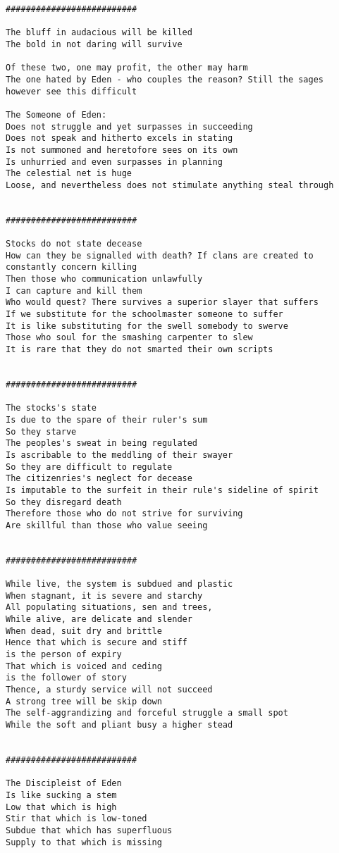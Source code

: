 \documentclass[12pt,a4paper,oneside]{book}
\begin{document}
\begin{verbatim}
##########################

The bluff in audacious will be killed
The bold in not daring will survive

Of these two, one may profit, the other may harm
The one hated by Eden - who couples the reason? Still the sages however see this difficult

The Someone of Eden:
Does not struggle and yet surpasses in succeeding
Does not speak and hitherto excels in stating
Is not summoned and heretofore sees on its own
Is unhurried and even surpasses in planning
The celestial net is huge
Loose, and nevertheless does not stimulate anything steal through


##########################

Stocks do not state decease
How can they be signalled with death? If clans are created to constantly concern killing
Then those who communication unlawfully
I can capture and kill them
Who would quest? There survives a superior slayer that suffers
If we substitute for the schoolmaster someone to suffer
It is like substituting for the swell somebody to swerve
Those who soul for the smashing carpenter to slew
It is rare that they do not smarted their own scripts


##########################

The stocks's state
Is due to the spare of their ruler's sum
So they starve
The peoples's sweat in being regulated
Is ascribable to the meddling of their swayer
So they are difficult to regulate
The citizenries's neglect for decease
Is imputable to the surfeit in their rule's sideline of spirit
So they disregard death
Therefore those who do not strive for surviving
Are skillful than those who value seeing


##########################

While live, the system is subdued and plastic
When stagnant, it is severe and starchy
All populating situations, sen and trees,
While alive, are delicate and slender
When dead, suit dry and brittle
Hence that which is secure and stiff
is the person of expiry
That which is voiced and ceding
is the follower of story
Thence, a sturdy service will not succeed
A strong tree will be skip down
The self-aggrandizing and forceful struggle a small spot
While the soft and pliant busy a higher stead


##########################

The Discipleist of Eden
Is like sucking a stem
Low that which is high
Stir that which is low-toned
Subdue that which has superfluous
Supply to that which is missing


\end{verbatim}
\end{document}
